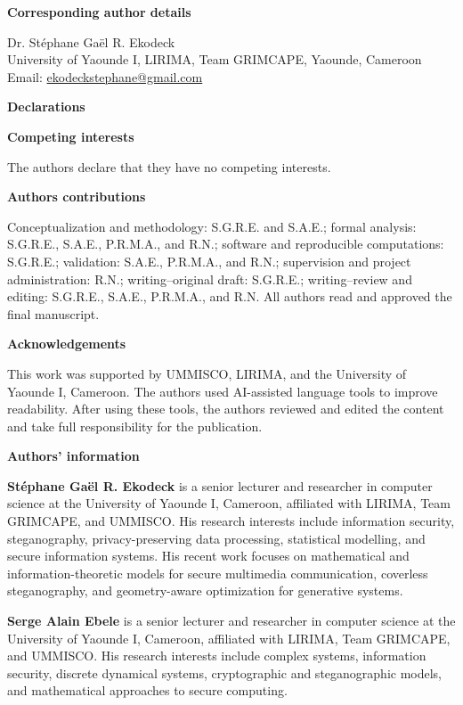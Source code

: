 \documentclass[11pt,a4paper]{article}
\begin{document}
\vspace{1em}
\textbf{Corresponding author details}

Dr. St\'ephane Ga\"el R. Ekodeck\\
University of Yaounde I, LIRIMA, Team GRIMCAPE, Yaounde, Cameroon\\
Email: \href{mailto:ekodeckstephane@gmail.com}{ekodeckstephane@gmail.com}

\vspace{1em}
\textbf{Declarations}

\textbf{Competing interests}

The authors declare that they have no competing interests.

\textbf{Authors contributions}

Conceptualization and methodology: S.G.R.E. and S.A.E.; formal analysis:
S.G.R.E., S.A.E., P.R.M.A., and R.N.; software and reproducible computations:
S.G.R.E.; validation: S.A.E., P.R.M.A., and R.N.; supervision and project
administration: R.N.; writing--original draft: S.G.R.E.; writing--review and
editing: S.G.R.E., S.A.E., P.R.M.A., and R.N. All authors read and approved
the final manuscript.

\textbf{Acknowledgements}

This work was supported by UMMISCO, LIRIMA, and the University of Yaounde I,
Cameroon. The authors used AI-assisted language tools to improve readability.
After using these tools, the authors reviewed and edited the content and take
full responsibility for the publication.

\textbf{Authors' information}

\textbf{St\'ephane Ga\"el R. Ekodeck} is a senior lecturer and researcher in
computer science at the University of Yaounde I, Cameroon, affiliated with
LIRIMA, Team GRIMCAPE, and UMMISCO. His research interests include information
security, steganography, privacy-preserving data processing, statistical
modelling, and secure information systems. His recent work focuses on
mathematical and information-theoretic models for secure multimedia
communication, coverless steganography, and geometry-aware optimization for
generative systems.

\textbf{Serge Alain Ebele} is a senior lecturer and researcher in computer
science at the University of Yaounde I, Cameroon, affiliated with LIRIMA, Team
GRIMCAPE, and UMMISCO. His research interests include complex systems,
information security, discrete dynamical systems, cryptographic and
steganographic models, and mathematical approaches to secure computing.
\end{document}
